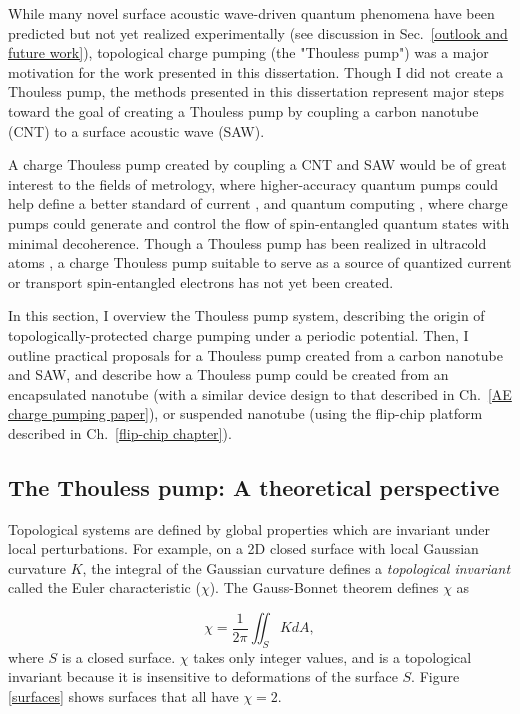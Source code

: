 \documentclass{beavtex_dub_edit}
\begin{document}
While many novel surface acoustic wave-driven quantum phenomena have been predicted but not yet realized experimentally (see discussion in Sec.\ \ref{outlook and future work}), topological charge pumping (the "Thouless pump") was a major motivation for the work presented in this dissertation. Though I did not create a Thouless pump, the methods presented in this dissertation represent major steps toward the goal of creating a Thouless pump by coupling a carbon nanotube (CNT) to a surface acoustic wave (SAW).

A charge Thouless pump created by coupling a CNT and SAW would be of great interest to the fields of metrology, where higher-accuracy quantum pumps could help define a better standard of current \cite{pekola_single-electron_2013,scherer_singleelectron_2019}, and quantum computing \cite{das_controlled_2006}, where charge pumps could generate and control the flow of spin-entangled quantum states with minimal decoherence. Though a Thouless pump has been realized in ultracold atoms \cite{citro_thouless_2023}, a charge Thouless pump suitable to serve as a source of quantized current or transport spin-entangled electrons has not yet been created. 

In this section, I overview the Thouless pump system, describing the origin of topologically-protected charge pumping under a periodic potential. Then, I outline practical proposals for a Thouless pump created from a carbon nanotube and SAW, and describe how a Thouless pump could be created from an encapsulated nanotube (with a similar device design to that described in Ch.\ \ref{AE charge pumping paper}), or suspended nanotube (using the flip-chip platform described in Ch.\ \ref{flip-chip chapter}).

\subsection{The Thouless pump: A theoretical perspective}

Topological systems are defined by global properties which are invariant under local perturbations. For example, on a 2D closed surface with local Gaussian curvature $K$, the integral of the Gaussian curvature defines a \textit{topological invariant} called the Euler characteristic ($\chi$). The Gauss-Bonnet theorem defines $\chi$ as

\begin{equation}
    \chi = \frac{1}{2\pi}\iint_S K dA,
\end{equation}
where $S$ is a closed surface. $\chi$ takes only integer values, and is a topological invariant because it is insensitive to deformations of the surface $S$. Figure \ref{surfaces} shows surfaces that all have $\chi = 2$.
\end{document}
